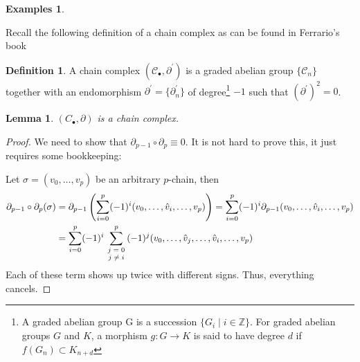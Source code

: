 \documentclass[draft,toc=bib]{scrartcl}
\theoremstyle{plain}
\newtheorem{lemma}[theorem]{Lemma}
\theoremstyle{definition}
\newtheorem	{definition}[theorem]{Definition}
\newtheorem{examples}[theorem]{Examples}
\theoremstyle{remark}
\newcommand{\Z}{\mathbb{Z}}
\begin{document}
\begin{examples}
\begin{enumerate}
	\end{enumerate}
	
\end{examples}



Recall the following definition of a chain complex as can be found in Ferrario's book \parencite[p. 65]{fe}
\begin{definition}
	A chain complex $(\mathcal{C}_\bullet,\partial^\prime)$ is a graded abelian group $\{\mathcal{C}_n\}$ together with an endomorphism $\partial^\prime=\{\partial^\prime_n\}$ of degree\footnote{A graded abelian group G is a succession $\{G_i\mid i\in \Z\}$. For graded abelian groups $G$ and $K$, a morphism $g: G\to K$ is said to have degree $d$ if $f(G_n)\subset K_{n+d}$} $-1$ such that $(\partial^\prime)^2=0$.
\end{definition}

\begin{lemma}
	$(C_\bullet,\partial)$ is a chain complex.
\end{lemma}

\begin{proof}
	We need to show that $\partial_{p-1}\circ\partial_p\equiv 0$. It is not hard to prove this, it just requires some bookkeeping:
	
	Let $\sigma=(v_0,\dots,v_p)$ be an arbitrary $p$-chain, then
	\begin{align*}
		\partial_{p-1}\circ\partial_p(\sigma)&=\partial_{p-1}\left(\sum_{i=0}^{p}(-1)^i(v_0,\dots,\hat{v}_i,\dots,v_p)\right)=\sum_{i=0}^{p}(-1)^i\partial_{p-1}(v_0,\dots,\hat{v}_i,\dots,v_p)\\
		&=\sum_{i=0}^{p}(-1)^i\sum_{\parbox{.8cm}{\centering\scriptsize
				$j=0$\\$j\neq i$}}^{p}(-1)^j(v_0,\dots,\hat{v}_j,\dots,\hat{v}_i,\dots,v_p)
	\end{align*}
	Each of these term shows up twice with different signs. Thus, everything cancels.

\end{proof}
\end{document}
